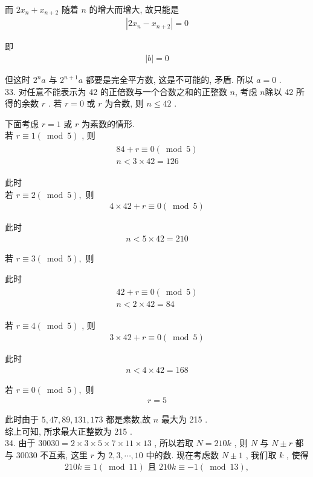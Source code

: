 而 $2 x_{n}+x_{n+2}$ 随着 $n$ 的增大而增大, 故只能是
\begin{align*}
	\left|2 x_{n}-x_{n+2}\right|=0
\end{align*}

即
\begin{align*}
	|b|=0
\end{align*}

但这时 $2^{n} a$ 与 $2^{n+1} a$ 都要是完全平方数, 这是不可能的, 矛盾. 所以 $a=0$ . \\
33. 对任意不能表示为 42 的正倍数与一个合数之和的正整数 $n$, 考虑 $n$除以 42 所得的余数 $r$ . 若 $r=0$ 或 $r$ 为合数, 则 $n \leqslant 42$ .

下面考虑 $r=1$ 或 $r$ 为素数的情形. \\
若 $r \equiv 1(\bmod 5)$ , 则
\begin{align*}
	\begin{gathered}
		84+r \equiv 0(\bmod 5) \\
		n<3 \times 42=126
	\end{gathered}
\end{align*}

此时\\
若 $r \equiv 2(\bmod 5) , $ 则
\begin{align*}
	4 \times 42+r \equiv 0(\bmod 5)
\end{align*}

此时
\begin{align*}
	n<5 \times 42=210
\end{align*}

若 $r \equiv 3(\bmod 5) , $ 则

此时
\begin{align*}
	\begin{gathered}
		42+r \equiv 0(\bmod 5) \\
		n<2 \times 42=84
	\end{gathered}
\end{align*}

若 $r \equiv 4(\bmod 5)$ , 则
\begin{align*}
	3 \times 42+r \equiv 0(\bmod 5)
\end{align*}

此时
\begin{align*}
	n<4 \times 42=168
\end{align*}

若 $r \equiv 0(\bmod 5) , $ 则
\begin{align*}
	r=5
\end{align*}

此时由于 $5,47,89,131,173$ 都是素数,故 $n$ 最大为 215 . \\
综上可知, 所求最大正整数为 215 .\\
34. 由于 $30030=2 \times 3 \times 5 \times 7 \times 11 \times 13$ , 所以若取 $N=210 k$ , 则 $N$ 与 $N \pm r$ 都与 30030 不互素, 这里 $r$ 为 $2,3, \cdots, 10$ 中的数. 现在考虑数 $N \pm 1$ , 我们取 $k$ , 使得
\begin{align*}
	210 k \equiv 1(\bmod 11) \text { 且 } 210 k \equiv-1(\bmod 13),
\end{align*}

